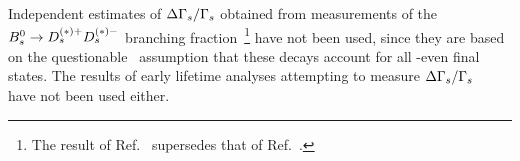 Independent estimates of $\Delta\Gamma_{s}/\Gamma_{s}$ obtained from measurements of the 
$B^0_s \to D_s^{(*)+} D_s^{(*)-}$ branching fraction~\cite{Barate:2000kd,Esen:2010jq_mod,Abazov:2008ig,Abulencia:2007zz}\footnote{
  \label{foot:life_mix:Abazov:2008ig}
  The result of Ref.~\cite{Abazov:2008ig} supersedes that of Ref.~\cite{Abazov:2007rb}.
}
have not been used,
since they are based on the questionable~\cite{Lenz:2011ti,*Lenz:2006hd}
assumption that these decays account for all \CP-even final states.
The results of early lifetime analyses attempting
to measure $\Delta\Gamma_{s}/\Gamma_{s}$~\cite{Acciarri:1998uv,Abreu:2000sh,Abreu:2000ev,Abe:1997bd}
have not been used either. 











